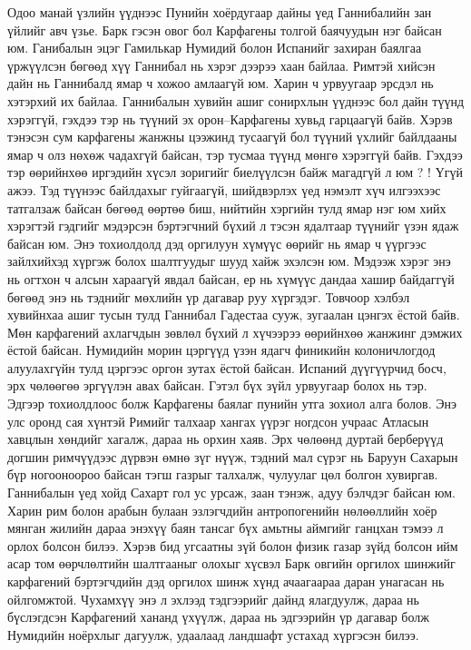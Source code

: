 Одоо манай үзлийн үүднээс Пунийн хоёрдугаар дайны үед Ганнибалийн зан үйлийг авч үзье. Барк гэсэн овог бол Карфагены толгой баячуудын нэг байсан юм. Ганибалын эцэг Гамилькар Нумидий болон Испанийг захиран баялгаа үржүүлсэн бөгөөд хүү Ганнибал нь хэрэг дээрээ хаан байлаа. Римтэй хийсэн дайн нь Ганнибалд ямар ч хожоо амлаагүй юм. Харин ч урвуугаар эрсдэл нь хэтэрхий их байлаа. Ганнибалын хувийн ашиг сонирхлын үүднээс бол дайн түүнд хэрэггүй, гэхдээ тэр нь түүний эх орон–Карфагены хувьд гарцаагүй байв. Хэрэв тэнэсэн сум карфагены жанжны цээжинд тусаагүй бол түүний үхлийг байлдааны ямар ч олз нөхөж чадахгүй байсан, тэр тусмаа түүнд мөнгө хэрэггүй байв. Гэхдээ тэр өөрийнхөө иргэдийн хүсэл зоригийг биелүүлсэн байж магадгүй л юм ? ! Үгүй ажээ. Тэд түүнээс байлдахыг гуйгаагүй, шийдвэрлэх үед нэмэлт хүч илгээхээс татгалзаж байсан бөгөөд өөртөө биш, нийтийн хэргийн тулд ямар нэг юм хийх хэрэгтэй гэдгийг мэдэрсэн бэртэгчний бүхий л тэсэн ядалтаар түүнийг үзэн ядаж байсан юм.
Энэ тохиолдолд дэд оргилуун хүмүүс өөрийг нь ямар ч үүргээс зайлхийхэд хүргэж болох шалтгуудыг шууд хайж эхэлсэн юм. Мэдээж хэрэг энэ нь огтхон ч алсын хараагүй явдал байсан, ер нь хүмүүс дандаа хашир байдаггүй бөгөөд энэ нь тэднийг мөхлийн үр дагавар руу хүргэдэг. Товчоор хэлбэл хувийнхаа ашиг тусын тулд Ганнибал Гадестаа сууж, зугаалан цэнгэх ёстой байв. Мөн карфагений ахлагчдын зөвлөл бүхий л хүчээрээ өөрийнхөө жанжинг дэмжих ёстой байсан. Нумидийн морин цэргүүд үзэн ядагч финикийн колоничлогдод алуулахгүйн тулд цэргээс оргон зутах ёстой байсан. Испаний дүүгүүрчид босч, эрх чөлөөгөө эргүүлэн авах байсан. Гэтэл бүх зүйл урвуугаар болох нь тэр. Эдгээр тохиолдлоос болж Карфагены баялаг пунийн утга зохиол алга болов. Энэ улс оронд сая хүнтэй Римийг талхаар хангах үүрэг ногдсон учраас Атласын хавцлын хөндийг хагалж, дараа нь орхин хаяв. Эрх чөлөөнд дуртай берберүүд догшин римчүүдээс дүрвэн өмнө зүг нүүж, тэдний мал сүрэг нь Баруун Сахарын бүр ногооноороо байсан тэгш газрыг талхалж, чулуулаг цөл болгон хувиргав. Ганнибалын үед хойд Сахарт гол ус урсаж, заан тэнэж, адуу бэлчдэг байсан юм. Харин рим болон арабын булаан эзлэгчдийн антропогенийн нөлөөллийн хоёр мянган жилийн дараа энэхүү баян тансаг бүх амьтны аймгийг ганцхан тэмээ л орлох болсон билээ.
Хэрэв бид угсаатны зүй болон физик газар зүйд болсон ийм асар том өөрчлөлтийн шалтгааныг олохыг хүсвэл Барк овгийн оргилох шинжийг карфагений бэртэгчдийн дэд оргилох шинж хүнд ачаагаараа даран унагасан нь ойлгомжтой. Чухамхүү энэ л эхлээд тэдгээрийг дайнд ялагдуулж, дараа нь бүслэгдсэн Карфагений хананд үхүүлж, дараа нь эдгээрийн үр дагавар болж Нумидийн ноёрхлыг дагуулж, удаалаад ландшафт устахад хүргэсэн билээ.
